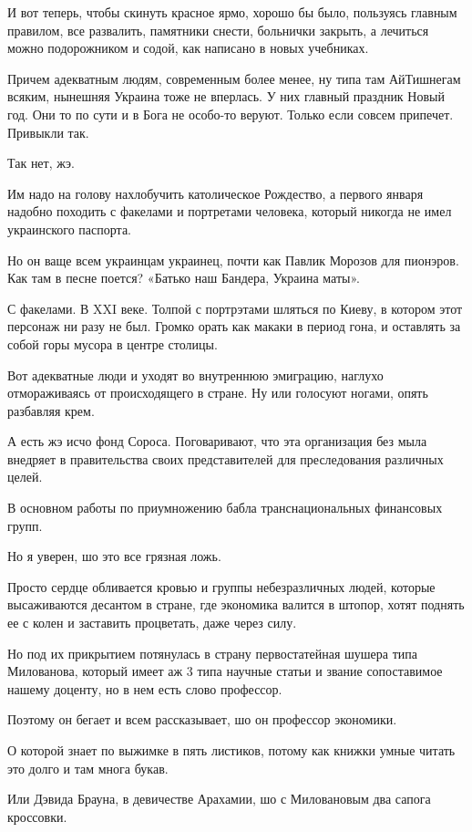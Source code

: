 \begin{multicols}{2}
И вот теперь, чтобы скинуть красное ярмо, хорошо бы было, пользуясь главным
правилом, все развалить, памятники снести, больнички закрыть, а лечиться можно
подорожником и содой, как написано в новых учебниках.

Причем адекватным людям, современным более менее, ну типа там АйТишнегам
всяким, нынешняя Украина тоже не вперлась. У них главный праздник Новый год.
Они то по сути и в Бога не особо-то веруют. Только если совсем припечет.
Привыкли так.

Так нет, жэ.

Им надо на голову нахлобучить католическое Рождество, а первого января надобно
походить с факелами и портретами человека, который никогда не имел украинского
паспорта.

Но он ваще всем украинцам украинец, почти как Павлик Морозов для пионэров. Как
там в песне поется? «Батько наш Бандера, Украина маты».

С факелами. В XXI веке. Толпой с портрэтами шляться по Киеву, в котором этот
персонаж ни разу не был. Громко орать как макаки в период гона, и оставлять за
собой горы мусора в центре столицы.

Вот адекватные люди и уходят во внутреннюю эмиграцию, наглухо отмораживаясь от
происходящего в стране. Ну или голосуют ногами, опять разбавляя крем.

А есть жэ исчо фонд Сороса. Поговаривают, что эта организация без мыла внедряет
в правительства своих представителей для преследования различных целей.

В основном работы по приумножению бабла транснациональных финансовых групп.

Но я уверен, шо это все грязная ложь.

Просто сердце обливается кровью и группы небезразличных людей, которые
высаживаются десантом в стране, где экономика валится в штопор, хотят поднять
ее с колен и заставить процветать, даже через силу.

Но под их прикрытием потянулась в страну первостатейная шушера типа Милованова,
который имеет аж 3 типа научные статьи и звание сопоставимое нашему доценту, но
в нем есть слово профессор.

Поэтому он бегает и всем рассказывает, шо он профессор экономики.

О которой знает по выжимке в пять листиков, потому как книжки умные читать это
долго и там многа букав.

Или Дэвида Брауна, в девичестве Арахамии, шо с Миловановым два сапога
кроссовки.


\end{multicols}
